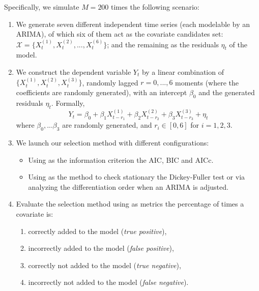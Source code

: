 \documentclass[twoside]{article}
\begin{document}
Specifically, we simulate $M=200$ times the following scenario: 
\begin{enumerate}
    \item We generate seven different independent time series (each modelable by an ARIMA), of which six of them act as the covariate candidates set: $\mathcal{X} = \{ X_t^{(1)}, X_t^{(2)}, ..., X_t^{(6)} \}$; and the remaining as the residuals $\eta_t$ of the model.
    \item We construct the dependent variable $Y_t$ by a linear combination of $\{ X_t^{(1)}, X_t^{(2)}, X_t^{(3)} \}$, randomly lagged $r=0,...,6$ moments  (where the coefficients are randomly generated), with an intercept $\beta_0$ and the generated residuals $\eta_t$. Formally,
    \[ Y_t = \beta_0  + \beta_1 X_{t-r_1}^{(1)} + \beta_2 X_{t-r_2}^{(2)} + \beta_3 X_{t-r_3}^{(3)} + \eta_t \]
    where $\beta_0,... \beta_3$ are randomly generated, and $r_i \in [0, 6]$ for $i=1,2,3$.
    \item We launch our selection method with different configurations:
    \begin{itemize}
        \item Using as the information criterion the AIC, BIC and AICc.
        \item Using as the method to check stationary the Dickey-Fuller test or via analyzing the differentiation order when an ARIMA is adjusted.
    \end{itemize}
    \item Evaluate the selection method using as metrics the percentage of times a covariate is:
    \begin{enumerate}
        \item correctly added to the model (\textit{true positive}),
        \item incorrectly added to the model (\textit{false positive}),
        \item correctly not added to the model (\textit{true negative}),
        \item incorrectly not added to the model (\textit{false negative}).
    \end{enumerate}
\end{enumerate}
\end{document}
